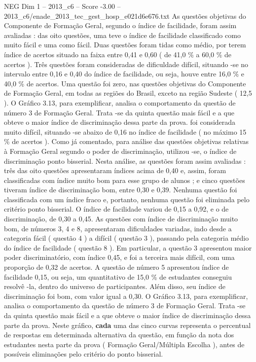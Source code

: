 \begin{textsample}{NEG Dim 1 – 2013\_c6 – Score -3.00 – 2013\_c6/enade\_2013\_tec\_gest\_hosp\_e021d6e676.txt}
As questões objetivas do Componente de Formação Geral, segundo o índice de facilidade, foram assim avaliadas : das oito questões, uma teve o índice de facilidade classificado como muito fácil e uma como fácil.
Duas questões foram tidas como médio, por terem índice de acertos situado na faixa entre 0,41 e 0,60 ( de 41,0 \% a 60,0 \% de acertos ).
Três questões foram consideradas de dificuldade difícil, situando -se no intervalo entre 0,16 e 0,40 do índice de facilidade, ou seja, houve entre 16,0 \% e 40,0 \% de acertos.
Uma questão foi zero, nas questões objetivas do Componente de Formação Geral, em todas as regiões do Brasil, exceto na região Sudeste ( 12,5 ).
O Gráfico 3.13, para exemplificar, analisa o comportamento da questão de número 3 de Formação Geral.
Trata -se da quinta questão mais fácil e a que obteve o maior índice de discriminação dessa parte da prova. foi considerada muito difícil, situando -se abaixo de 0,16 no índice de facilidade ( no máximo 15 \% de acertos ).
Como já comentado, para análise das questões objetivas relativas à Formação Geral segundo o poder de discriminação, utilizou -se, o índice de discriminação ponto bisserial.
Nesta análise, as questões foram assim avaliadas : três das oito questões apresentaram índices acima de 0,40 e, assim, foram classificadas com índice muito bom para esse grupo de alunos ; e cinco questões tiveram índice de discriminação bom, entre 0,30 e 0,39.
Nenhuma questão foi classificada com um índice fraco e, portanto, nenhuma questão foi eliminada pelo critério ponto bisserial.
O índice de facilidade variou de 0,15 a 0,92, e o de discriminação, de 0,30 a 0,45.
As questões com índice de discriminação muito bom, de números 3, 4 e 8, apresentaram dificuldades variadas, indo desde a categoria fácil ( questão 4 ) a difícil ( questão 3 ), passando pela categoria médio do índice de facilidade ( questão 8 ).
Em particular, a questão 3 apresentou maior poder discriminatório, com índice 0,45, e foi a terceira mais difícil, com uma proporção de 0,32 de acertos.
A questão de número 5 apresentou índice de facilidade 0,15, ou seja, um quantitativo de 15,0 \% de estudantes conseguiu resolvê -la, dentro do universo de participantes.
Além disso, seu índice de discriminação foi bom, com valor igual a 0,30.
O Gráfico 3.13, para exemplificar, analisa o comportamento da questão de número 3 de Formação Geral.
Trata -se da quinta questão mais fácil e a que obteve o maior índice de discriminação dessa parte da prova.
Neste gráfico, \textbf{cada} uma das cinco curvas representa o percentual de respostas em determinada alternativa da questão, em função da nota dos estudantes nesta parte da prova ( Formação Geral/Múltipla Escolha ), antes de possíveis eliminações pelo critério do ponto bisserial.

\end{textsample}
